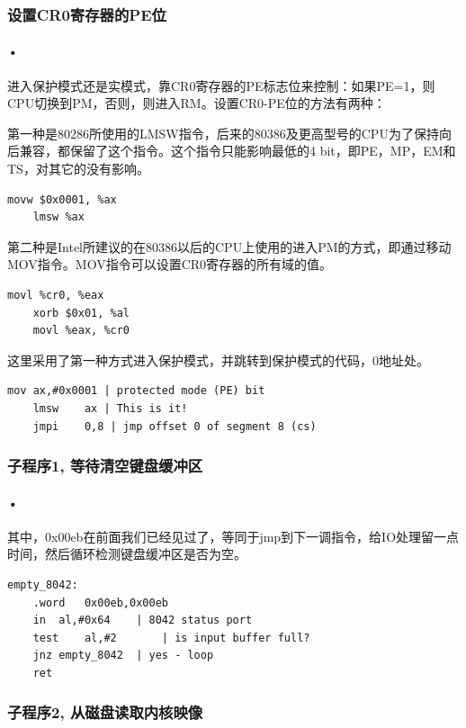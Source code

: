 \documentclass[12pt]{article}
\begin{document}
\subsubsection{设置CR0寄存器的PE位}	
\paragraph{•}
进入保护模式还是实模式，靠CR0寄存器的PE标志位来控制：如果PE=1，则CPU切换到PM，否则，则进入RM。设置CR0-PE位的方法有两种：

第一种是80286所使用的LMSW指令，后来的80386及更高型号的CPU为了保持向后兼容，都保留了这个指令。这个指令只能影响最低的4 bit，即PE，MP，EM和TS，对其它的没有影响。
\begin{lstlisting}[breaklines]
	movw $0x0001, %ax
	lmsw %ax
\end{lstlisting}	
第二种是Intel所建议的在80386以后的CPU上使用的进入PM的方式，即通过移动MOV指令。MOV指令可以设置CR0寄存器的所有域的值。
\begin{lstlisting}[breaklines]
	movl %cr0, %eax
	xorb $0x01, %al
	movl %eax, %cr0
\end{lstlisting}	
这里采用了第一种方式进入保护模式，并跳转到保护模式的代码，0地址处。
\begin{lstlisting}[breaklines]
	mov	ax,#0x0001 | protected mode (PE) bit
	lmsw	ax | This is it!
	jmpi	0,8 | jmp offset 0 of segment 8 (cs)
\end{lstlisting}	
\subsubsection{子程序1, 等待清空键盘缓冲区}	
\paragraph{•}
其中，0x00eb在前面我们已经见过了，等同于jmp到下一调指令，给IO处理留一点时间，然后循环检测键盘缓冲区是否为空。
\begin{lstlisting}[breaklines]
empty_8042:
	.word	0x00eb,0x00eb
	in	al,#0x64	| 8042 status port
	test	al,#2		| is input buffer full?
	jnz	empty_8042	| yes - loop
	ret
\end{lstlisting}	
\subsubsection{子程序2, 从磁盘读取内核映像}	
\end{document}
